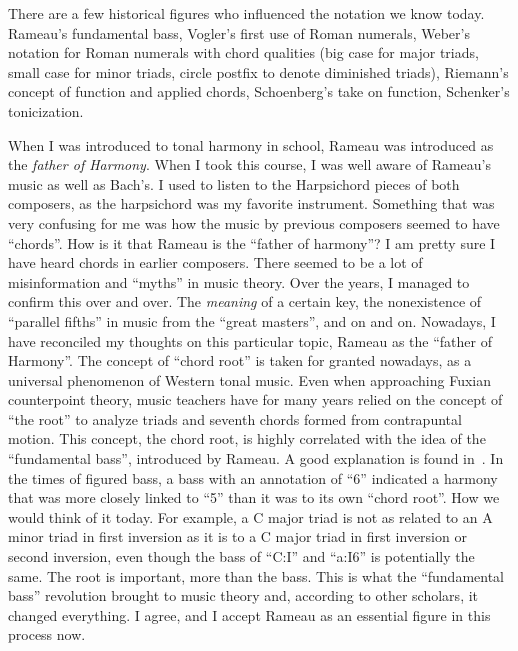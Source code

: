 There are a few historical figures who influenced the notation we know today.
Rameau's fundamental bass, Vogler's first use of Roman numerals, Weber's notation for Roman numerals with chord qualities (big case for major triads, small case for minor triads, circle postfix to denote diminished triads), Riemann's concept of function and applied chords, Schoenberg's take on function, Schenker's tonicization.

When I was introduced to tonal harmony in school, Rameau was introduced as the \emph{father of Harmony}.
When I took this course, I was well aware of Rameau's music as well as Bach's.
I used to listen to the Harpsichord pieces of both composers, as the harpsichord was my favorite instrument.
Something that was very confusing for me was how the music by previous composers seemed to have ``chords''.
How is it that Rameau is the ``father of harmony''? I am pretty sure I have heard chords in earlier composers.
There seemed to be a lot of misinformation and ``myths'' in music theory.
Over the years, I managed to confirm this over and over.
The \emph{meaning} of a certain key, the nonexistence of ``parallel fifths'' in music from the ``great masters'', and on and on.
Nowadays, I have reconciled my thoughts on this particular topic, Rameau as the ``father of Harmony''.
The concept of ``chord root'' is taken for granted nowadays, as a universal phenomenon of Western tonal music.
Even when approaching Fuxian counterpoint theory, music teachers have for many years relied on the concept of ``the root'' to analyze triads and seventh chords formed from contrapuntal motion.
This concept, the chord root, is highly correlated with the idea of the ``fundamental bass'', introduced by Rameau.
A good explanation is found in~\cite{christensen_rameau_2002}.
In the times of figured bass, a bass with an annotation of ``6'' indicated a harmony that was more closely linked to ``5'' than it was to its own ``chord root''.
How we would think of it today.
For example, a C major triad is not as related to an A minor triad in first inversion as it is to a C major triad in first inversion or second inversion, even though the bass of ``C:I'' and ``a:I6'' is potentially the same.
The root is important, more than the bass.
This is what the ``fundamental bass'' revolution brought to music theory and, according to other scholars, it changed everything.
I agree, and I accept Rameau as an essential figure in this process now.



